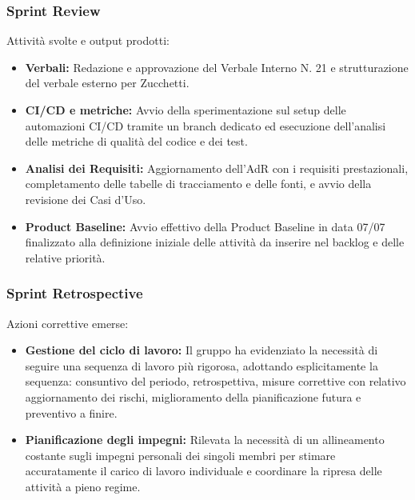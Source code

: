 \subsubsection{Sprint Review}
Attività svolte e output prodotti:
\begin{itemize}
    \item \textbf{Verbali:} Redazione e approvazione del Verbale Interno N. 21 e strutturazione del verbale esterno per Zucchetti.
    \item \textbf{CI/CD e metriche:} Avvio della sperimentazione sul setup delle automazioni CI/CD tramite un branch dedicato ed esecuzione dell'analisi delle metriche di qualità del codice e dei test.
    \item \textbf{Analisi dei Requisiti:} Aggiornamento dell'AdR con i requisiti prestazionali, completamento delle tabelle di tracciamento e delle fonti, e avvio della revisione dei Casi d'Uso.
    \item \textbf{Product Baseline:} Avvio effettivo della Product Baseline in data 07/07 finalizzato alla definizione iniziale delle attività da inserire nel backlog e delle relative priorità.
\end{itemize}

\subsubsection{Sprint Retrospective}
Azioni correttive emerse:
\begin{itemize}
    \item \textbf{Gestione del ciclo di lavoro:} Il gruppo ha evidenziato la necessità di seguire una sequenza di lavoro più rigorosa, adottando esplicitamente la sequenza: consuntivo del periodo, retrospettiva, misure correttive con relativo aggiornamento dei rischi, miglioramento della pianificazione futura e preventivo a finire.
    \item \textbf{Pianificazione degli impegni:} Rilevata la necessità di un allineamento costante sugli impegni personali dei singoli membri per stimare accuratamente il carico di lavoro individuale e coordinare la ripresa delle attività a pieno regime.
\end{itemize}